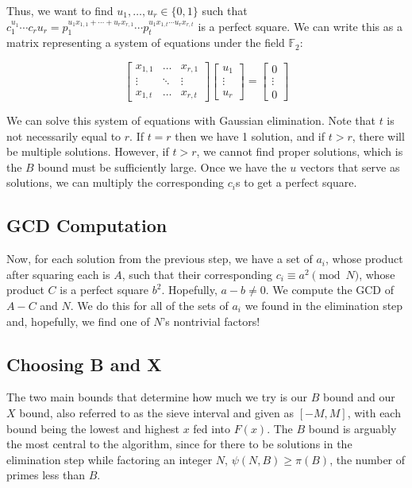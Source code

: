 \documentclass[11pt,reqno]{amsart}
\theoremstyle{definition}
\begin{document}
Thus, we want to find $u_1,\ldots, u_r \in \{0, 1\}$ such that $c_1^{u_1}\cdots c_r{u_r} = p_1^{u_1 x_{1,1} + \cdots + u_r x_{r, 1}}\cdots p_t^{u_1 x_{1,t} \cdots u_r x_{r, t}}$ is a perfect square. We can write this as a matrix representing a system of equations under the field $\mathbb{F}_2$:

$$\begin{bmatrix}
   x_{1,1} & \ldots & x_{r, 1} \\
   \vdots & \ddots & \vdots \\
   x_{1, t} & \ldots & x_{r, t}
\end{bmatrix} \begin{bmatrix}
   u_1 \\
   \vdots \\
   u_r
\end{bmatrix} = \begin{bmatrix}
   0 \\
   \vdots \\
   0
\end{bmatrix}$$

We can solve this system of equations with Gaussian elimination. Note that $t$ is not necessarily equal to $r$. If $t = r$ then we have 1 solution, and if $t > r$, there will be multiple solutions. However, if $t > r$, we cannot find proper solutions, which is the $B$ bound must be sufficiently large. Once we have the $u$ vectors that serve as solutions, we can multiply the corresponding $c_i$s to get a perfect square. 

\subsection{GCD Computation}
Now, for each solution from the previous step, we have a set of $a_i$, whose product after squaring each is $A$, such that their corresponding $c_i \equiv a^2 \pmod{N}$, whose product $C$ is a perfect square $b^2$. Hopefully, $a - b \neq 0$. We compute the GCD of $A - C$ and $N$. We do this for all of the sets of $a_i$ we found in the elimination step and, hopefully, we find one of $N$'s nontrivial factors!

\subsection{Choosing B and X}
The two main bounds that determine how much we try is our $B$ bound and our $X$ bound, also referred to as the sieve interval and given as $[-M, M]$, with each bound being the lowest and highest $x$ fed into $F(x)$. The $B$ bound is arguably the most central to the algorithm, since for there to be solutions in the elimination step while factoring an integer $N$, $\psi(N, B) \geq \pi(B)$, the number of primes less than $B$. 
\end{document}
